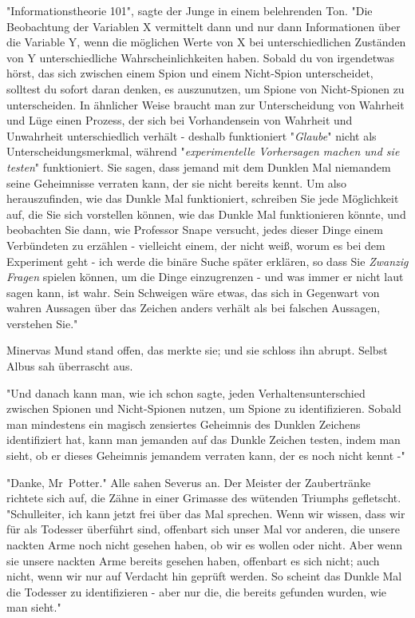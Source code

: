 {"Informationstheorie 101", sagte der Junge in einem belehrenden Ton. "Die Beobachtung der Variablen X vermittelt dann und nur dann Informationen über die Variable Y, wenn die möglichen Werte von X bei unterschiedlichen Zuständen von Y unterschiedliche Wahrscheinlichkeiten haben. Sobald du von irgendetwas hörst, das sich zwischen einem Spion und einem Nicht-Spion unterscheidet, solltest du sofort daran denken, es auszunutzen, um Spione von Nicht-Spionen zu unterscheiden. In ähnlicher Weise braucht man zur Unterscheidung von Wahrheit und Lüge einen Prozess, der sich bei Vorhandensein von Wahrheit und Unwahrheit unterschiedlich verhält - deshalb funktioniert "\emph{Glaube}" nicht als Unterscheidungsmerkmal, während "\emph{experimentelle Vorhersagen machen und sie testen}" funktioniert. Sie sagen, dass jemand mit dem Dunklen Mal niemandem seine Geheimnisse verraten kann, der sie nicht bereits kennt. Um also herauszufinden, wie das Dunkle Mal funktioniert, schreiben Sie jede Möglichkeit auf, die Sie sich vorstellen können, wie das Dunkle Mal funktionieren könnte, und beobachten Sie dann, wie Professor Snape versucht, jedes dieser Dinge einem Verbündeten zu erzählen - vielleicht einem, der nicht weiß, worum es bei dem Experiment geht - ich werde die binäre Suche später erklären, so dass Sie \emph{Zwanzig Fragen} spielen können, um die Dinge einzugrenzen - und was immer er nicht laut sagen kann, ist wahr. Sein Schweigen wäre etwas, das sich in Gegenwart von wahren Aussagen über das Zeichen anders verhält als bei falschen Aussagen, verstehen Sie."

Minervas Mund stand offen, das merkte sie; und sie schloss ihn abrupt. Selbst Albus sah überrascht aus.

"Und danach kann man, wie ich schon sagte, jeden Verhaltensunterschied zwischen Spionen und Nicht-Spionen nutzen, um Spione zu identifizieren. Sobald man mindestens ein magisch zensiertes Geheimnis des Dunklen Zeichens identifiziert hat, kann man jemanden auf das Dunkle Zeichen testen, indem man sieht, ob er dieses Geheimnis jemandem verraten kann, der es noch nicht kennt -"

"Danke, Mr~Potter." Alle sahen Severus an. Der Meister der Zaubertränke richtete sich auf, die Zähne in einer Grimasse des wütenden Triumphs gefletscht. "Schulleiter, ich kann jetzt frei über das Mal sprechen. Wenn wir wissen, dass wir für als Todesser überführt sind, offenbart sich unser Mal vor anderen, die unsere nackten Arme noch nicht gesehen haben, ob wir es wollen oder nicht. Aber wenn sie unsere nackten Arme bereits gesehen haben, offenbart es sich nicht; auch nicht, wenn wir nur auf Verdacht hin geprüft werden. So scheint das Dunkle Mal die Todesser zu identifizieren - aber nur die, die bereits gefunden wurden, wie man sieht."

}
